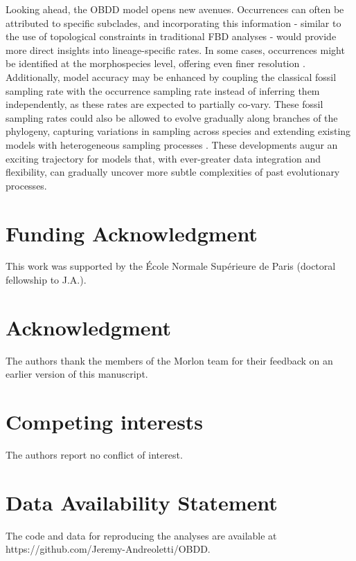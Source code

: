\documentclass[oupdraft]{sysbio}
\begin{document}
Looking ahead, the OBDD model opens new avenues. Occurrences can often be attributed to specific subclades, and incorporating this information - similar to the use of topological constraints in traditional FBD analyses \citep{baridosottani_putting_2023} - would provide more direct insights into lineage-specific rates. In some cases, occurrences might be identified at the morphospecies level, offering even finer resolution \citep{silvestro_bayesian_2014, stadler_fossilized_2018}.  Additionally, model accuracy may be enhanced by coupling the classical fossil sampling rate with the occurrence sampling rate instead of inferring them independently, as these rates are expected to partially co-vary. These fossil sampling rates could also be allowed to evolve gradually along branches of the phylogeny, capturing variations in sampling across species and extending existing models with heterogeneous sampling processes \citep{barido-sottani_integrating_2025}.  These developments augur an exciting trajectory for models that, with ever-greater data integration and flexibility, can gradually uncover more subtle complexities of past evolutionary processes.

\section{Funding Acknowledgment}

This work was supported by the École Normale Supérieure de Paris (doctoral fellowship to J.A.).

\section{Acknowledgment}

The authors thank the members of the Morlon team for their feedback on an earlier version of this manuscript.

\section{Competing interests}

The authors report no conflict of interest.

\section*{Data Availability Statement}

The code and data for reproducing the analyses are available at https://github.com/Jeremy-Andreoletti/OBDD.
\end{document}
